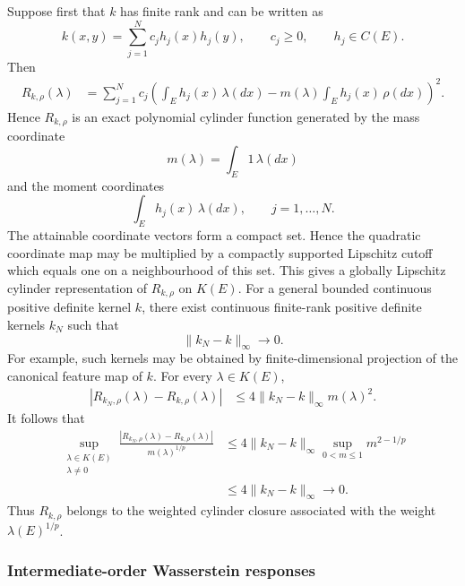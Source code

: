 \documentclass[a4paper,10pt]{article}
\begin{document}
Suppose first that \(k\) has finite rank and can be written as
\[
        k(x,y)
        =
        \sum_{j=1}^N
        c_jh_j(x)h_j(y),
        \qquad
        c_j\ge0,
        \qquad
        h_j\in C(E).
\]
Then
\[
\begin{aligned}
R_{k,\rho}(\lambda)
&=
\sum_{j=1}^N
c_j
\left(
        \int_Eh_j(x)\,\lambda(dx)
        -
        m(\lambda)\int_Eh_j(x)\,\rho(dx)
\right)^2.
\end{aligned}
\]
Hence \(R_{k,\rho}\) is an exact polynomial cylinder function generated
by the mass coordinate
\[
        m(\lambda)=\int_E1\,\lambda(dx)
\]
and the moment coordinates
\[
        \int_Eh_j(x)\,\lambda(dx),
        \qquad
        j=1,\ldots,N.
\]
The attainable coordinate vectors form a compact set. Hence the
quadratic coordinate map may be multiplied by a compactly supported
Lipschitz cutoff which equals one on a neighbourhood of this set.
This gives a globally Lipschitz cylinder representation of
\(R_{k,\rho}\) on \(K(E)\).
For a general bounded continuous positive definite kernel \(k\), there
exist continuous finite-rank positive definite kernels \(k_N\) such
that
\[
        \lVert k_N-k\rVert_\infty
        \longrightarrow0.
\]
For example, such kernels may be obtained by finite-dimensional
projection of the canonical feature map of \(k\). For every
\(\lambda\in K(E)\),
\[
\begin{aligned}
|R_{k_N,\rho}(\lambda)-R_{k,\rho}(\lambda)|
&\le
4\lVert k_N-k\rVert_\infty m(\lambda)^2.
\end{aligned}
\]
It follows that
\[
\begin{aligned}
\sup_{\substack{\lambda\in K(E)\\\lambda\ne0}}
\frac{
|R_{k_N,\rho}(\lambda)-R_{k,\rho}(\lambda)|
}{
m(\lambda)^{1/p}
}
&\le
4\lVert k_N-k\rVert_\infty
\sup_{0<m\le1}m^{2-1/p}
\\
&\le
4\lVert k_N-k\rVert_\infty
\longrightarrow0.
\end{aligned}
\]
Thus \(R_{k,\rho}\) belongs to the weighted cylinder closure associated
with the weight \(\lambda(E)^{1/p}\).

\subsubsection{Intermediate-order Wasserstein responses}
\end{document}
